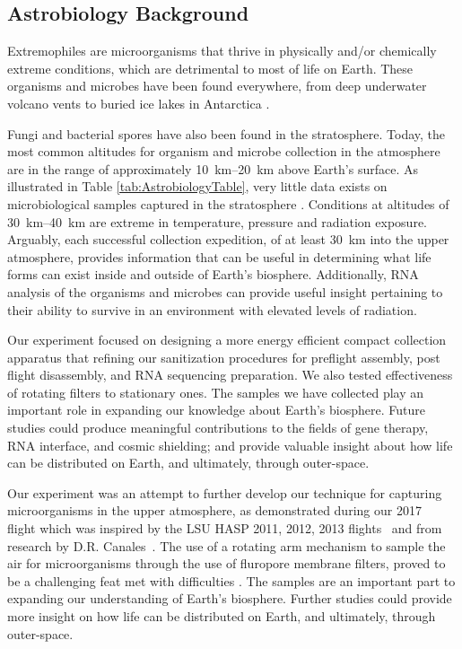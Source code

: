\subsection{Astrobiology Background}
\label{sec:Astrobiology-Background}
Extremophiles are microorganisms that thrive in physically and/or chemically extreme conditions, which are detrimental to most of life on Earth. These organisms and microbes have been found everywhere, from deep underwater volcano vents to buried ice lakes in Antarctica \cite{Extremophiles}. 

Fungi and bacterial spores have also been found in the stratosphere. Today, the most common altitudes for organism and microbe collection in the atmosphere are in the range of approximately \SIrange{10}{20}{\kilo\meter} above Earth’s surface. As illustrated in Table \ref{tab:AstrobiologyTable}, very little data exists on microbiological samples captured in the stratosphere \cite{Extremophiles}. Conditions at altitudes of \SIrange{30}{40}{\kilo\meter} are extreme in temperature, pressure and radiation exposure. Arguably, each successful collection expedition, of at least \SI{30}{\kilo\meter} into the upper atmosphere, provides information that can be useful in determining what life forms can exist inside and outside of Earth’s biosphere. Additionally, RNA analysis of the organisms and microbes can provide useful insight pertaining to their ability to survive in an environment with elevated levels of radiation.  

Our experiment focused on designing a more energy efficient compact collection apparatus that refining our sanitization procedures for preflight assembly, post flight disassembly, and RNA sequencing preparation. We also tested effectiveness of rotating filters to stationary ones. The samples we have collected play an important role in expanding our knowledge about Earth’s biosphere. Future studies could produce meaningful contributions to the fields of gene therapy, RNA interface, and cosmic shielding; and provide valuable insight about how life can be distributed on Earth, and ultimately, through outer-space.


Our experiment was an attempt to further develop our technique for capturing microorganisms in the upper atmosphere, as demonstrated during our 2017~\cite{SORA1} flight which was inspired by the LSU HASP 2011, 2012, 2013 flights~\cite{LSU} and from research by D.R. Canales~\cite{Canales}.  The use of a rotating arm mechanism to sample the air for microorganisms through the use of fluropore membrane filters, proved to be a challenging feat met with difficulties . The samples are an important part to expanding our understanding of Earth's biosphere. Further studies could provide more insight on how life can be distributed on Earth, and ultimately, through outer-space.

